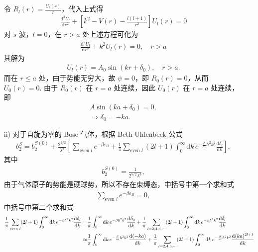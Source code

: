 \documentclass{assignment}
\begin{document}
\begin{sol}
\begin{itemize}
        令 $R_l(r)=\frac{U_l(r)}{r}$，代入上式得
        \begin{align}
            \frac{\mathrm{d}^2U_l}{\mathrm{d}r^2}+\left[k^2-V(r)-\frac{l(l+1)}{r^2}\right]U_l(r)=0
        \end{align}
        对 $s$ 波，$l=0$，在 $r>a$ 处上述方程可化为
        \begin{align}
            \frac{\mathrm{d}^2U_l}{\mathrm{d}r^2}+k^2U_l(r)=0,\quad r>a
        \end{align}
        其解为
        \begin{align}
            U_l(r)=A_0\sin\left(kr+\delta_0\right),\quad r>a.
        \end{align}
        而在 $r\leq a$ 处，由于势能无穷大，故 $\psi=0$，即 $R_0(r)=0$，从而 $U_0(r)=0$.
        由于 $R_0(r)$ 在 $r=a$ 处连续，因此 $U_0(r)$ 在 $r=a$ 处连续，即
        \begin{gather}
            A\sin\left(ka+\delta_0\right)=0,\\
            \Longrightarrow\delta_0=-ka.
        \end{gather}
        \item[ii)] 对于自旋为零的 Bose 气体，根据 Beth-Uhlenbeck 公式
        \begin{align}
            b_2^S=b_2^{S(0)}+\frac{2^{3/2}}{\lambda^3}\left[\sum_{\text{even }l}e^{-\beta\varepsilon_B}+\frac{1}{\pi}\sum_{\text{even }l}(2l+1)\int_0^{\infty}\mathrm{d}k\,e^{-\frac{\beta}{m}\hbar^2k^2}\frac{\mathrm{d}\delta_l}{\mathrm{d}k}\right],
        \end{align}
        其中
        \begin{align}
            b_2^{S(0)}=\frac{1}{2^{5/2}\lambda^3},
        \end{align}
        由于气体原子的势能是硬球势，所以不存在束缚态，中括号中第一个求和式
        \begin{align}
            \sum_{\text{even }l}e^{-\beta\varepsilon_B}=0,
        \end{align}
        中括号中第二个求和式
        \begin{align}
            \notag\frac{1}{\pi}\sum_{\text{even }l}(2l+1)\int_0^{\infty}\mathrm{d}k\,e^{-\beta\hbar^2k^2}\frac{\mathrm{d}\delta_l}{\mathrm{d}k}=&\frac{1}{\pi}\int_0^{\infty}\mathrm{d}k\,e^{-\beta\hbar^2k^2}\frac{\mathrm{d}\delta_0}{\mathrm{d}k}+\frac{1}{\pi}\sum_{l=2,4,6,\cdots}(2l+1)\int_0^{\infty}\mathrm{d}k\,e^{-\beta\hbar^2k^2}\frac{\mathrm{d}\delta_l}{\mathrm{d}k}\\
            \notag\approx&\frac{1}{\pi}\int_0^{\infty}\mathrm{d}k\,e^{-\frac{\beta}{m}\hbar^2k^2}\frac{\mathrm{d}(-ka)}{\mathrm{d}k}+\frac{1}{\pi}\sum_{l=2,4,6,\cdots}(2l+1)\int_0^{\infty}\mathrm{d}k\,e^{-\frac{\beta}{m}\hbar^2k^2}\frac{\mathrm{d}(ka)^{2l+1}}{\mathrm{d}k}\\

\end{align}
\end{itemize}
\end{sol}
\end{document}
